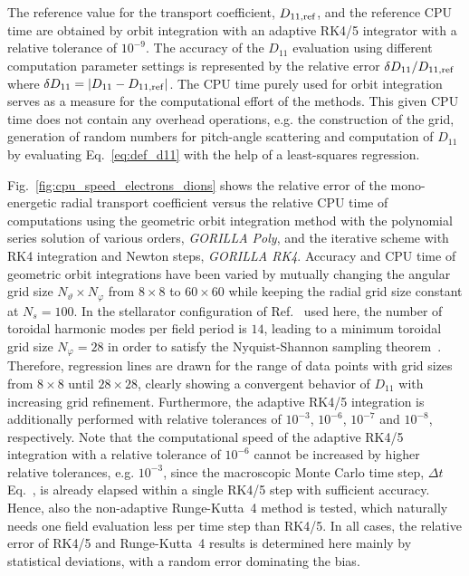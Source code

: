 \documentclass[./main.tex]{subfiles}
\begin{document}
The reference value for the transport coefficient, $D_{11,\rm{ref}}$,
and the reference CPU time are obtained by orbit integration
with an adaptive RK4/5 integrator with a relative tolerance of $10^{-9}$.
The accuracy of the $D_{11}$ evaluation using different computation parameter settings
is represented by the relative error $\delta D_{11} / D_{11,\rm{ref}}$
where $\delta D_{11} = |D_{11} - D_{11,\rm{ref}}|$.
The CPU time purely used for orbit integration serves as
a measure for the computational effort of the methods.
This given CPU time does not contain any overhead operations, e.g. the construction of the grid, generation of random numbers for
pitch-angle scattering and computation of $D_{11}$ by evaluating
Eq.~\ref{eq:def_d11} with the help of a least-squares regression.


Fig.~\ref{fig:cpu_speed_electrons_dions} shows the relative error of the mono-energetic
radial transport coefficient versus the relative CPU time of computations using the
geometric orbit integration
method with the polynomial series solution of various orders, \textit{GORILLA Poly},
and the iterative scheme with RK4 integration and Newton steps, \textit{GORILLA RK4}.
Accuracy and CPU time of geometric orbit integrations have been varied by
mutually changing the angular grid size $N_\vartheta \times N_\varphi$
from $8 \times 8$ to $60 \times 60$ while keeping the radial grid size
constant at $N_s = 100$. In the stellarator configuration of
Ref.~\cite{drevlak_quasi-isodynamic_2014} used here, the number of toroidal harmonic modes
per field period is $14$, leading to a minimum toroidal grid size $N_\varphi = 28$ in
order to satisfy the Nyquist-Shannon sampling theorem~\cite{nyquist_certain_1928,shannon_mathematical_1948}.
Therefore, regression lines are drawn for the range of data points with grid sizes
from $8 \times 8$ until $28 \times 28$, clearly showing a convergent behavior
of $D_{11}$ with increasing grid refinement.
Furthermore, the adaptive RK4/5 integration is additionally performed with
relative tolerances of $10^{-3}$, $10^{-6}$, $10^{-7}$ and $10^{-8}$, respectively.
Note that the computational
speed of the adaptive RK4/5 integration with a relative tolerance of $10^{-6}$ cannot be
increased by higher relative tolerances, e.g. $10^{-3}$, since the macroscopic Monte Carlo
time step, $\Delta t$ Eq.~, is already elapsed within a single
RK4/5 step with sufficient accuracy. Hence, also the non-adaptive Runge-Kutta~4 method
is tested, which naturally needs one field evaluation less per time step than RK4/5.
In all cases, the relative error of RK4/5 and Runge-Kutta~4 results is determined here
mainly by statistical deviations, with a random error dominating the bias.
\end{document}
